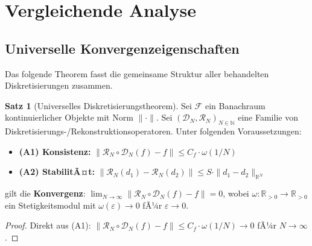 ﻿\documentclass[a4paper,12pt]{article}
\theoremstyle{definition}
\newtheorem{satz}{Satz}
\begin{document}
\section{Vergleichende Analyse}

\subsection{Universelle Konvergenzeigenschaften}

Das folgende Theorem fasst die gemeinsame Struktur aller behandelten Diskretisierungen zusammen.

\begin{satz}[Universelles Diskretisierungstheorem]
    Sei $\mathcal{F}$ ein Banachraum kontinuierlicher Objekte mit Norm $\|\cdot\|$. Sei $(\mathcal{D}_N, \mathcal{R}_N)_{N\in\mathbb{N}}$ eine Familie von Diskretisierungs-/Rekonstruktionsoperatoren. Unter folgenden Voraussetzungen:
    \begin{itemize}
        \item \textbf{(A1) Konsistenz:} $\|\mathcal{R}_N \circ \mathcal{D}_N(f) - f\| \leq C_f \cdot \omega(1/N)$
        \item \textbf{(A2) StabilitÃ¤t:} $\|\mathcal{R}_N(d_1) - \mathcal{R}_N(d_2)\| \leq S \cdot \|d_1 - d_2\|_{\mathbb{R}^N}$
    \end{itemize}
    gilt die \textbf{Konvergenz}: $\lim_{N\to\infty}\|\mathcal{R}_N \circ \mathcal{D}_N(f) - f\| = 0$,
    wobei $\omega : \mathbb{R}_{>0} \to \mathbb{R}_{>0}$ ein Stetigkeitsmodul mit $\omega(\varepsilon)\to 0$ fÃ¼r $\varepsilon\to 0$.
\end{satz}

\begin{proof}
    Direkt aus (A1): $\|\mathcal{R}_N \circ \mathcal{D}_N(f) - f\| \leq C_f \cdot \omega(1/N) \to 0$ fÃ¼r $N \to \infty$. \qedhere
\end{proof}
\end{document}
